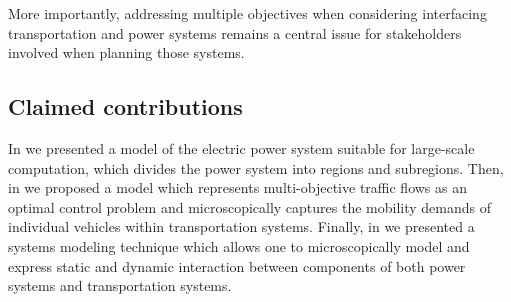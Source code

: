 
More importantly, addressing multiple objectives when considering interfacing transportation and power systems remains a central issue for stakeholders involved when planning those systems. 


\subsection{Claimed contributions}
\label{contributions}

In \cite{Hackenberg2012} we presented a model of the electric power system suitable for large-scale computation, which divides the power system into regions and subregions.
Then, in \cite{ascher2014early} we proposed a model which represents multi-objective traffic flows as an optimal control problem and microscopically captures the mobility demands of individual vehicles within transportation systems.
Finally, in \cite{ascher2015integrated} we presented a systems modeling technique which allows one to microscopically model and express static and dynamic interaction between components of both power systems and transportation systems.


